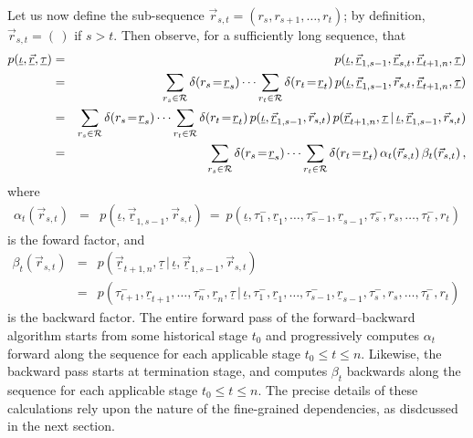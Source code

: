 \documentclass[a4paper]{article}
\newcommand{\ui}{\underline{\iota}}
\newcommand{\ut}{\underline{\tau}}
\newcommand{\ur}{\underline{r}}
\newcommand{\vr}{\vec{r}}
\newcommand{\uvr}{\underline{\vr}}
\newcommand{\tm}{\tau^{-}}
\begin{document}
Let us now define the sub-sequence $\vr_{s,t}=(r_s,r_{s+1},\ldots,r_t)$; by definition,
$\vr_{s,t}=(\,)$ if $s>t$.
Then observe, for a sufficiently long sequence, that
\begin{eqnarray}
p(\ui,\uvr,\ut) 
& = &
p(\ui,\uvr_{1,s-1},\uvr_{s,t},\uvr_{t+1,n},\ut)
\nonumber\\
& = &
\sum_{r_s\in{\cal R}} \delta(r_s\!=\!\ur_s)
\cdots\sum_{r_t\in{\cal R}} \delta(r_t\!=\!\ur_t)
\,p(\ui,\uvr_{1,s-1},\vr_{s,t},\uvr_{t+1,n},\ut)
\nonumber\\
& = &
\sum_{r_s\in{\cal R}} \delta(r_s\!=\!\ur_s)
\cdots\sum_{r_t\in{\cal R}} \delta(r_t\!=\!\ur_t)
\,p(\ui,\uvr_{1,s-1},\vr_{s,t})
\,p(\uvr_{t+1,n},\ut\,|\,\ui,\uvr_{1,s-1},\vr_{s,t})
\nonumber\\
& = &
\sum_{r_s\in{\cal R}} \delta(r_s\!=\!\ur_s)
\cdots\sum_{r_t\in{\cal R}} \delta(r_t\!=\!\ur_t)
\,\alpha_t(\vr_{s,t})\,\beta_t(\vr_{s,t})\,,
\end{eqnarray}
where
\begin{eqnarray}
\alpha_t(\vr_{s,t}) & = & p(\ui,\uvr_{1,s-1},\vr_{s,t})~=~p(\ui,\tau_1^-,\ur_1,\ldots,\tm_{s-1},\ur_{s-1},
\tm_s,r_s,\ldots,\tm_t,r_t)
\label{eq:fwd-pass-basic}
\end{eqnarray}
is the foward factor,
and
\begin{eqnarray}
\beta_t(\vr_{s,t}) & = & p(\uvr_{t+1,n},\ut\,|\,\ui,\uvr_{1,s-1},\vr_{s,t})
\nonumber\\& = &
p(\tm_{t+1},\ur_{t+1},\ldots,\tm_n,\ur_n,\ut\,|\,\ui,\tau_1^-,\ur_1,\ldots,\tm_{s-1},\ur_{s-1},
\tm_s,r_s,\ldots,\tm_t,r_t)\
\label{eq:bwd-pass-basic}
\end{eqnarray}
is the backward factor.
The entire forward pass of the forward--backward algorithm starts from some historical stage $t_0$ and
progressively computes $\alpha_t$ forward along the sequence for each applicable stage $t_0\le t\le n$. Likewise,
the backward pass starts at termination stage, and computes $\beta_t$
backwards along the sequence for each applicable stage $t_0\le t\le n$. The precise details of these calculations rely upon
the nature of the fine-grained dependencies, as disdcussed in the next section.

\end{document}
